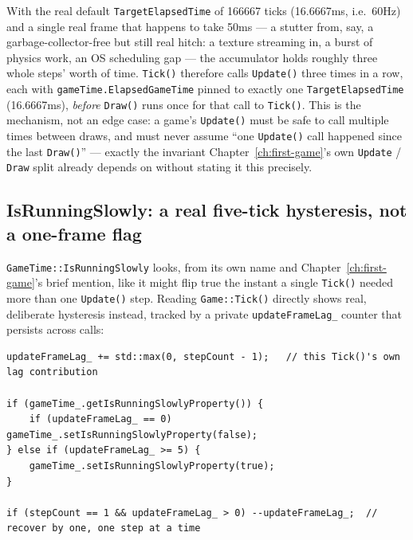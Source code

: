 With the real default \texttt{TargetElapsedTime} of 166667 ticks (16.6667ms, i.e.\ 60Hz) and a
single real frame that happens to take 50ms --- a stutter from, say, a garbage-collector-free but
still real hitch: a texture streaming in, a burst of physics work, an OS scheduling gap --- the
accumulator holds roughly three whole steps' worth of time. \texttt{Tick()} therefore calls
\texttt{Update()} three times in a row, each with \texttt{gameTime.ElapsedGameTime} pinned to
exactly one \texttt{TargetElapsedTime} (16.6667ms), \emph{before} \texttt{Draw()} runs once for
that call to \texttt{Tick()}. This is the mechanism, not an edge case: a game's \texttt{Update()}
must be safe to call multiple times between draws, and must never assume ``one \texttt{Update()}
call happened since the last \texttt{Draw()}'' --- exactly the invariant
Chapter~\ref{ch:first-game}'s own \texttt{Update} / \texttt{Draw} split already depends on
without stating it this precisely.

\subsection{IsRunningSlowly: a real five-tick hysteresis, not a one-frame flag}

\texttt{GameTime::IsRunningSlowly} looks, from its own name and Chapter~\ref{ch:first-game}'s
brief mention, like it might flip true the instant a single \texttt{Tick()} needed more than one
\texttt{Update()} step. Reading \texttt{Game::Tick()} directly shows real, deliberate hysteresis
instead, tracked by a private \texttt{updateFrameLag\_} counter that persists across calls:

\begin{lstlisting}
updateFrameLag_ += std::max(0, stepCount - 1);   // this Tick()'s own lag contribution

if (gameTime_.getIsRunningSlowlyProperty()) {
    if (updateFrameLag_ == 0) gameTime_.setIsRunningSlowlyProperty(false);
} else if (updateFrameLag_ >= 5) {
    gameTime_.setIsRunningSlowlyProperty(true);
}

if (stepCount == 1 && updateFrameLag_ > 0) --updateFrameLag_;  // recover by one, one step at a time
\end{lstlisting}

